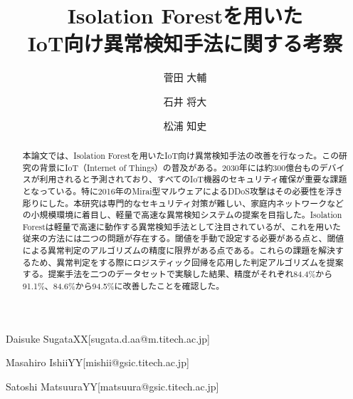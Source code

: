 \documentclass{css}
\begin{document}

\title{Isolation Forestを用いた\\IoT向け異常検知手法に関する考察}



\author{菅田 大輔}{Daisuke Sugata}{XX}[sugata.d.aa@m.titech.ac.jp]
\author{石井 将大}{Masahiro Ishii}{YY}[mishii@gsic.titech.ac.jp]
\author{松浦 知史}{Satoshi Matsuura}{YY}[matsuura@gsic.titech.ac.jp]



\begin{abstract}
    本論文では、Isolation Forestを用いたIoT向け異常検知手法の改善を行なった。この研究の背景にIoT（Internet of Things）の普及がある。2030年には約300億台ものデバイスが利用されると予測されており、すべてのIoT機器のセキュリティ確保が重要な課題となっている。特に2016年のMirai型マルウェアによるDDoS攻撃はその必要性を浮き彫りにした。本研究は専門的なセキュリティ対策が難しい、家庭内ネットワークなどの小規模環境に着目し、軽量で高速な異常検知システムの提案を目指した。Isolation Forestは軽量で高速に動作する異常検知手法として注目されているが、これを用いた従来の方法には二つの問題が存在する。閾値を手動で設定する必要がある点と、閾値による異常判定のアルゴリズムの精度に限界がある点である。これらの課題を解決するため、異常判定をする際にロジスティック回帰を応用した判定アルゴリズムを提案する。提案手法を二つのデータセットで実験した結果、精度がそれぞれ84.4\%から91.1\%、84.6\%から94.5\%に改善したことを確認した。
\end{abstract}
\end{document}
